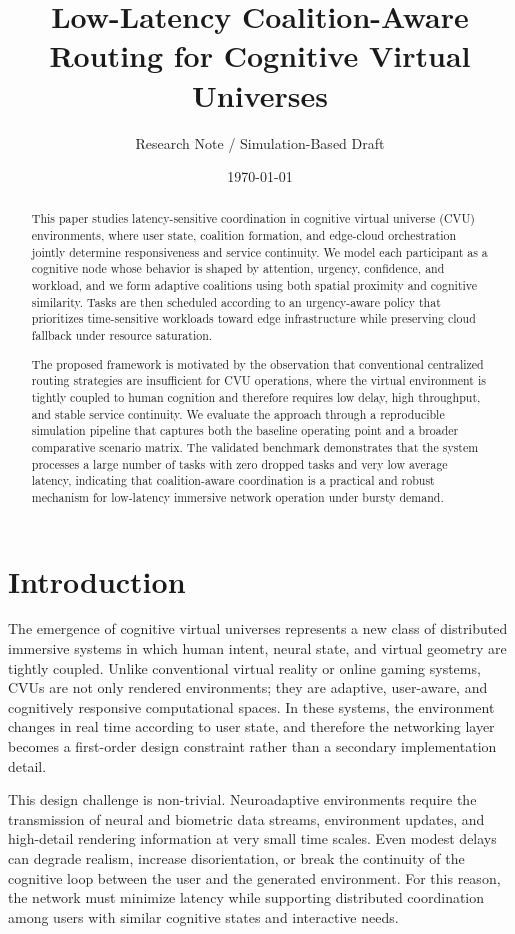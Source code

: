 \documentclass[11pt]{article}
\title{Low-Latency Coalition-Aware Routing for Cognitive Virtual Universes}
\author{Research Note / Simulation-Based Draft}
\date{\today}
\begin{document}
\maketitle

\begin{abstract}
This paper studies latency-sensitive coordination in cognitive virtual universe (CVU) environments, where user state, coalition formation, and edge-cloud orchestration jointly determine responsiveness and service continuity. We model each participant as a cognitive node whose behavior is shaped by attention, urgency, confidence, and workload, and we form adaptive coalitions using both spatial proximity and cognitive similarity. Tasks are then scheduled according to an urgency-aware policy that prioritizes time-sensitive workloads toward edge infrastructure while preserving cloud fallback under resource saturation.

The proposed framework is motivated by the observation that conventional centralized routing strategies are insufficient for CVU operations, where the virtual environment is tightly coupled to human cognition and therefore requires low delay, high throughput, and stable service continuity. We evaluate the approach through a reproducible simulation pipeline that captures both the baseline operating point and a broader comparative scenario matrix. The validated benchmark demonstrates that the system processes a large number of tasks with zero dropped tasks and very low average latency, indicating that coalition-aware coordination is a practical and robust mechanism for low-latency immersive network operation under bursty demand.
\end{abstract}

\section{Introduction}
The emergence of cognitive virtual universes represents a new class of distributed immersive systems in which human intent, neural state, and virtual geometry are tightly coupled. Unlike conventional virtual reality or online gaming systems, CVUs are not only rendered environments; they are adaptive, user-aware, and cognitively responsive computational spaces. In these systems, the environment changes in real time according to user state, and therefore the networking layer becomes a first-order design constraint rather than a secondary implementation detail.

This design challenge is non-trivial. Neuroadaptive environments require the transmission of neural and biometric data streams, environment updates, and high-detail rendering information at very small time scales. Even modest delays can degrade realism, increase disorientation, or break the continuity of the cognitive loop between the user and the generated environment. For this reason, the network must minimize latency while supporting distributed coordination among users with similar cognitive states and interactive needs.
\end{document}

